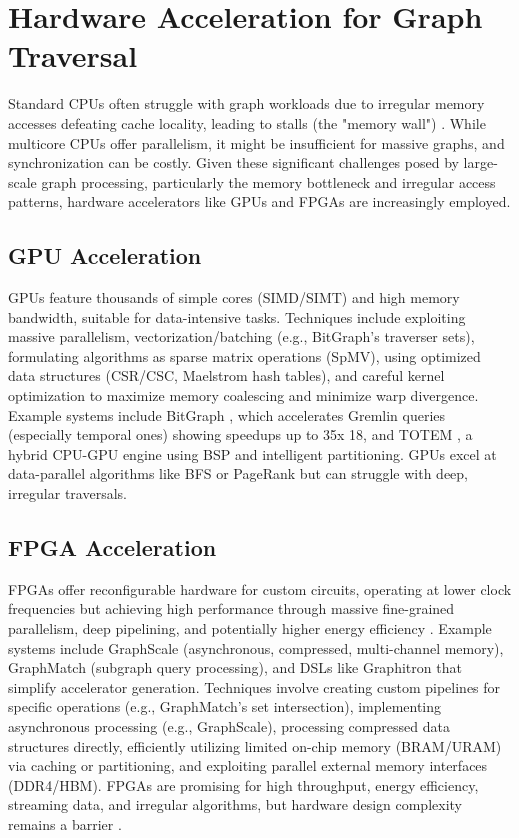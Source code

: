 \documentclass[sigconf,natbib=false]{acmart}
\begin{document}
\section{Hardware Acceleration for Graph Traversal}
Standard CPUs often struggle with graph workloads due to irregular memory accesses defeating cache locality, leading to stalls (the "memory wall") \cite{liu2020LargescaleGraphProcessing}.
While multicore CPUs offer parallelism, it might be insufficient for massive graphs, and synchronization can be costly. %
Given these significant challenges posed by large-scale graph processing, particularly the memory bottleneck and irregular access patterns, hardware accelerators like GPUs and FPGAs are increasingly employed.

\subsection{GPU Acceleration}
GPUs feature thousands of simple cores (SIMD/SIMT) and high memory bandwidth, suitable for data-intensive tasks.
Techniques include exploiting massive parallelism, vectorization/batching (e.g., BitGraph's traverser sets), formulating algorithms as sparse matrix operations (SpMV), using optimized data structures (CSR/CSC, Maelstrom hash tables), and careful kernel optimization to maximize memory coalescing and minimize warp divergence.
Example systems include BitGraph \cite{barghiBitGraphFrameworkScaling}, which accelerates Gremlin queries (especially temporal ones) showing speedups up to 35x 18, and TOTEM \cite{gharaibehEfficientLargeScaleGraph}, a hybrid CPU-GPU engine using BSP and intelligent partitioning.
GPUs excel at data-parallel algorithms like BFS or PageRank but can struggle with deep, irregular traversals. %

\subsection{FPGA Acceleration}
FPGAs offer reconfigurable hardware for custom circuits, operating at lower clock frequencies but achieving high performance through massive fine-grained parallelism, deep pipelining, and potentially higher energy efficiency \cite{besta2019GraphProcessingFPGAs}.
Example systems include GraphScale \cite{dann2024GraphScaleScalableProcessing}(asynchronous, compressed, multi-channel memory), GraphMatch \cite{dann2024GraphMatchSubgraphQuery}(subgraph query processing), and DSLs like Graphitron \cite{zhang2024GraphitronDomainSpecific} that simplify accelerator generation.
Techniques involve creating custom pipelines for specific operations (e.g., GraphMatch's set intersection), implementing asynchronous processing (e.g., GraphScale), processing compressed data structures directly, efficiently utilizing limited on-chip memory (BRAM/URAM) via caching or partitioning, and exploiting parallel external memory interfaces (DDR4/HBM).
FPGAs are promising for high throughput, energy efficiency, streaming data, and irregular algorithms, but hardware design complexity remains a barrier \cite{besta2019GraphProcessingFPGAs}.
\end{document}
